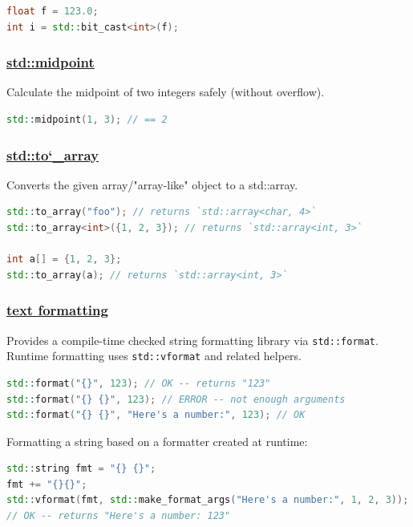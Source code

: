 \begin{lstlisting}[language=C++]
float f = 123.0;
int i = std::bit_cast<int>(f);
\end{lstlisting}

\subsubsection{\href{https://github.com/AnthonyCalandra/modern-cpp-features/tree/master\#stdmidpoint}
                    {std::midpoint}}
Calculate the midpoint of two integers safely (without overflow).

\begin{lstlisting}[language=C++]
std::midpoint(1, 3); // == 2
\end{lstlisting}

\subsubsection{\href{https://github.com/AnthonyCalandra/modern-cpp-features/tree/master\#stdto_array}
                    {std::to\char`_array}}
Converts the given array/"array-like" object to a std::array.

\begin{lstlisting}[language=C++]
std::to_array("foo"); // returns `std::array<char, 4>`
std::to_array<int>({1, 2, 3}); // returns `std::array<int, 3>`

int a[] = {1, 2, 3};
std::to_array(a); // returns `std::array<int, 3>`
\end{lstlisting}

\subsubsection{\href{https://github.com/AnthonyCalandra/modern-cpp-features/tree/master\#text-formatting}
                    {text formatting}}
Provides a compile-time checked string formatting library via \texttt{std::format}. 
Runtime formatting uses \texttt{std::vformat} and related helpers.

\begin{lstlisting}[language=C++]
std::format("{}", 123); // OK -- returns "123"
std::format("{} {}", 123); // ERROR -- not enough arguments
std::format("{} {}", "Here's a number:", 123); // OK
\end{lstlisting}

Formatting a string based on a formatter created at runtime:
\begin{lstlisting}[language=C++]
std::string fmt = "{} {}";
fmt += "{}{}";
std::vformat(fmt, std::make_format_args("Here's a number:", 1, 2, 3));
// OK -- returns "Here's a number: 123"
\end{lstlisting}

